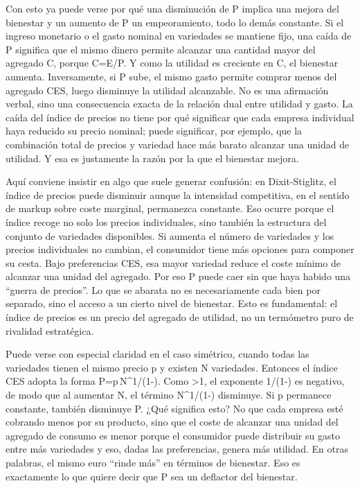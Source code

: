 \documentclass[10pt,a4paper]{article}
\begin{document}
Con esto ya puede verse por qué una disminución de P implica una mejora del bienestar y un aumento de P un empeoramiento, todo lo demás constante. Si el ingreso monetario o el gasto nominal en variedades se mantiene fijo, una caída de P significa que el mismo dinero permite alcanzar una cantidad mayor del agregado C, porque C=E/P. Y como la utilidad es creciente en C, el bienestar aumenta. Inversamente, si P sube, el mismo gasto permite comprar menos del agregado CES, luego disminuye la utilidad alcanzable. No es una afirmación verbal, sino una consecuencia exacta de la relación dual entre utilidad y gasto. La caída del índice de precios no tiene por qué significar que cada empresa individual haya reducido su precio nominal; puede significar, por ejemplo, que la combinación total de precios y variedad hace más barato alcanzar una unidad de utilidad. Y esa es justamente la razón por la que el bienestar mejora.

Aquí conviene insistir en algo que suele generar confusión: en Dixit-Stiglitz, el índice de precios puede disminuir aunque la intensidad competitiva, en el sentido de markup sobre coste marginal, permanezca constante. Eso ocurre porque el índice recoge no solo los precios individuales, sino también la estructura del conjunto de variedades disponibles. Si aumenta el número de variedades y los precios individuales no cambian, el consumidor tiene más opciones para componer su cesta. Bajo preferencias CES, esa mayor variedad reduce el coste mínimo de alcanzar una unidad del agregado. Por eso P puede caer sin que haya habido una “guerra de precios”. Lo que se abarata no es necesariamente cada bien por separado, sino el acceso a un cierto nivel de bienestar. Esto es fundamental: el índice de precios es un precio del agregado de utilidad, no un termómetro puro de rivalidad estratégica.

Puede verse con especial claridad en el caso simétrico, cuando todas las variedades tienen el mismo precio p y existen N variedades. Entonces el índice CES adopta la forma P=p\,N^{1/(1-\sigma)}. Como \sigma>1, el exponente 1/(1-\sigma) es negativo, de modo que al aumentar N, el término N^{1/(1-\sigma)} disminuye. Si p permanece constante, también disminuye P. ¿Qué significa esto? No que cada empresa esté cobrando menos por su producto, sino que el coste de alcanzar una unidad del agregado de consumo es menor porque el consumidor puede distribuir su gasto entre más variedades y eso, dadas las preferencias, genera más utilidad. En otras palabras, el mismo euro “rinde más” en términos de bienestar. Eso es exactamente lo que quiere decir que P sea un deflactor del bienestar.
\end{document}
